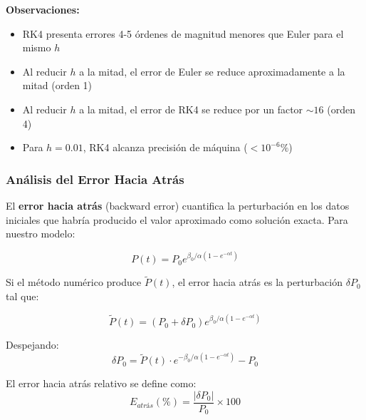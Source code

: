 \documentclass[a4paper,10pt,twocolumn]{article}
\begin{document}
\textbf{Observaciones:}
\begin{itemize}
    \item RK4 presenta errores 4-5 órdenes de magnitud menores que Euler para el mismo $h$
    \item Al reducir $h$ a la mitad, el error de Euler se reduce aproximadamente a la mitad (orden 1)
    \item Al reducir $h$ a la mitad, el error de RK4 se reduce por un factor $\sim 16$ (orden 4)
    \item Para $h=0.01$, RK4 alcanza precisión de máquina ($< 10^{-6}\%$)
\end{itemize}

\subsubsection{Análisis del Error Hacia Atrás}

El \textbf{error hacia atrás} (backward error) cuantifica la perturbación en los datos iniciales que habría producido el valor aproximado como solución exacta. Para nuestro modelo:

\[P(t) = P_0 e^{\beta_0/\alpha (1-e^{-\alpha t})}\]

Si el método numérico produce $\tilde{P}(t)$, el error hacia atrás es la perturbación $\delta P_0$ tal que:

\[\tilde{P}(t) = (P_0 + \delta P_0) e^{\beta_0/\alpha (1-e^{-\alpha t})}\]

Despejando:
\[\delta P_0 = \tilde{P}(t) \cdot e^{-\beta_0/\alpha (1-e^{-\alpha t})} - P_0\]

El error hacia atrás relativo se define como:
\[E_{atrás}(\%) = \frac{|\delta P_0|}{P_0} \times 100\]
\end{document}
